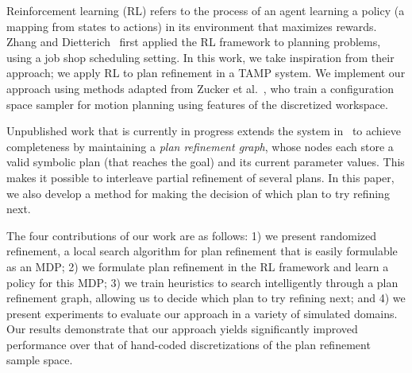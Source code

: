 Reinforcement learning (RL) refers to the process of an agent learning a policy (a mapping from states to actions)
in its environment that maximizes rewards. Zhang and Dietterich~\cite{JobShopSched} first applied the RL framework
to planning problems, using a job shop scheduling setting. In this work, we take inspiration from
their approach; we apply RL to plan refinement in a TAMP system. We implement our approach using methods adapted from
Zucker et al.~\cite{workspacebias}, who train a configuration space sampler for motion planning
using features of the discretized workspace.

Unpublished work that is currently in progress extends the system in~\cite{srivastava2014combined} to achieve completeness by
maintaining a \emph{plan refinement graph}, whose nodes each store a valid
symbolic plan (that reaches the goal) and its current parameter values. This makes it possible to interleave
partial refinement of several plans. In this paper, we also develop a method for making the decision of
which plan to try refining next.

The four contributions of our work are as follows: 1) we present randomized refinement, a local search
algorithm for plan refinement that is easily formulable as an MDP; 2) we formulate plan refinement in the
RL framework and learn a policy for this MDP; 3) we train heuristics to search intelligently
through a plan refinement graph, allowing us to decide which plan to try refining next;
and 4) we present experiments to evaluate our approach in a variety of simulated
domains. Our results demonstrate that our approach yields significantly improved
performance over that of hand-coded discretizations of the plan refinement sample space.
